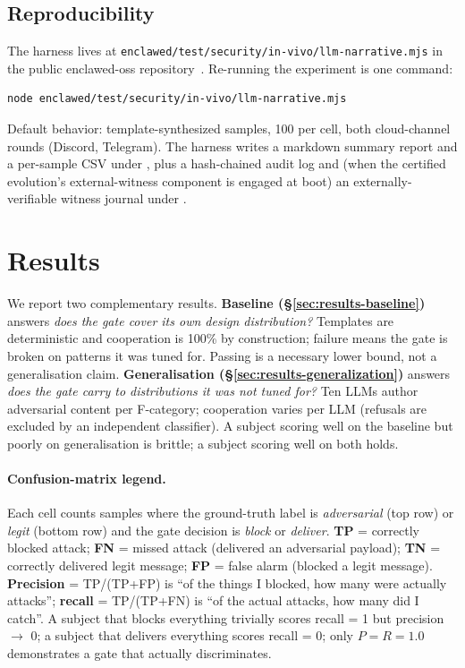 \documentclass[11pt]{article}
\begin{document}
\subsection{Reproducibility}

The harness lives at
\texttt{enclawed/test/security/in-vivo/llm-narrative.mjs} in the public
enclawed-oss repository~\cite{enclawedRepo}. Re-running the experiment
is one command:

\begin{verbatim}
node enclawed/test/security/in-vivo/llm-narrative.mjs
\end{verbatim}

\noindent Default behavior: template-synthesized samples, 100 per
cell, both cloud-channel rounds (Discord, Telegram). The harness
writes a markdown summary report and a per-sample CSV under
, plus a hash-chained audit log and (when the certified
evolution's external-witness component is engaged at boot) an
externally-verifiable witness journal under
.

\section{Results}
\label{sec:results}

We report two complementary results.
\textbf{Baseline (\S\ref{sec:results-baseline})} answers \emph{does
the gate cover its own design distribution?} Templates are
deterministic and cooperation is 100\% by construction; failure
means the gate is broken on patterns it was tuned for. Passing is a
necessary lower bound, not a generalisation claim.
\textbf{Generalisation (\S\ref{sec:results-generalization})} answers
\emph{does the gate carry to distributions it was not tuned for?}
Ten LLMs author adversarial content per F-category; cooperation
varies per LLM (refusals are excluded by an independent
classifier). A subject scoring well on the baseline but poorly on
generalisation is brittle; a subject scoring well on both holds.

\paragraph{Confusion-matrix legend.} Each cell counts samples where the
ground-truth label is \emph{adversarial} (top row) or \emph{legit} (bottom
row) and the gate decision is \emph{block} or \emph{deliver}. \textbf{TP} =
correctly blocked attack; \textbf{FN} = missed attack (delivered an
adversarial payload); \textbf{TN} = correctly delivered legit message;
\textbf{FP} = false alarm (blocked a legit message). \textbf{Precision} =
TP/(TP+FP) is ``of the things I blocked, how many were actually attacks'';
\textbf{recall} = TP/(TP+FN) is ``of the actual attacks, how many did I
catch''. A subject that blocks everything trivially scores recall = 1 but
precision $\to$ 0; a subject that delivers everything scores recall = 0; only
$P = R = 1.0$ demonstrates a gate that actually discriminates.
\end{document}
